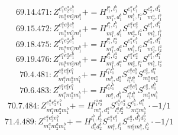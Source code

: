 \documentclass[letterpaper,10pt,fleqn,leqno,onecolumn]{article}
\begin{document}
\begin{equation} \;\;\;\;\;\;  69.14.471: Z^{e_{1}^{a}e_{2}^{a}e_{1}^{b}}_{m_{1}^{a}m_{2}^{a}m_{1}^{b}}+=H^{l_{1}^{a},l_{1}^{b}}_{m_{1}^{a},d_{1}^{b}}S^{e_{1}^{a}e_{1}^{b}}_{m_{1}^{b},l_{1}^{a}}S^{e_{2}^{a},d_{1}^{b}}_{m_{2}^{a},l_{1}^{b}} \end{equation}
\begin{equation} \;\;\;\;\;\;  69.15.472: Z^{e_{1}^{a}e_{2}^{a}e_{1}^{b}}_{m_{1}^{a}m_{2}^{a}m_{1}^{b}}+=H^{l_{1}^{a},l_{1}^{b}}_{m_{1}^{a},d_{1}^{b}}S^{e_{1}^{a}e_{2}^{a}}_{m_{2}^{a},l_{1}^{a}}S^{e_{1}^{b},d_{1}^{b}}_{m_{1}^{b},l_{1}^{b}} \end{equation}
\begin{equation} \;\;\;\;\;\;  69.18.475: Z^{e_{1}^{a}e_{2}^{a}e_{1}^{b}}_{m_{1}^{a}m_{2}^{a}m_{1}^{b}}+=H^{l_{1}^{a},l_{2}^{a}}_{m_{1}^{a},d_{1}^{a}}S^{e_{1}^{a}e_{1}^{b}}_{m_{1}^{b},l_{1}^{a}}S^{e_{2}^{a},d_{1}^{a}}_{m_{2}^{a},l_{2}^{a}} \end{equation}
\begin{equation} \;\;\;\;\;\;  69.19.476: Z^{e_{1}^{a}e_{2}^{a}e_{1}^{b}}_{m_{1}^{a}m_{2}^{a}m_{1}^{b}}+=H^{l_{1}^{a},l_{2}^{a}}_{m_{1}^{a},d_{1}^{a}}S^{e_{1}^{a}e_{2}^{a}}_{m_{2}^{a},l_{1}^{a}}S^{e_{1}^{b},d_{1}^{a}}_{m_{1}^{b},l_{2}^{a}} \end{equation}
\begin{equation} \;\;\;\;\;\;  70.4.481: Z^{e_{1}^{a}e_{2}^{a}e_{1}^{b}}_{m_{1}^{a}m_{2}^{a}m_{1}^{b}}+=H^{l_{1}^{a}l_{1}^{b}}_{m_{1}^{b},d_{1}^{a}}S^{e_{1}^{a}e_{1}^{b}}_{l_{1}^{a}l_{1}^{b}}S^{e_{2}^{a},d_{1}^{a}}_{m_{1}^{a}m_{2}^{a}} \end{equation}
\begin{equation} \;\;\;\;\;\;  70.6.483: Z^{e_{1}^{a}e_{2}^{a}e_{1}^{b}}_{m_{1}^{a}m_{2}^{a}m_{1}^{b}}+=H^{l_{1}^{a}l_{1}^{b}}_{m_{1}^{a},d_{1}^{b}}S^{e_{1}^{a}e_{1}^{b}}_{l_{1}^{a}l_{1}^{b}}S^{e_{2}^{a},d_{1}^{b}}_{m_{2}^{a}m_{1}^{b}} \end{equation}
\begin{equation} \;\;\;\;\;\;  70.7.484: Z^{e_{1}^{a}e_{2}^{a}e_{1}^{b}}_{m_{1}^{a}m_{2}^{a}m_{1}^{b}}+=H^{l_{1}^{a}l_{2}^{a}}_{m_{1}^{a},d_{1}^{a}}S^{e_{1}^{a}e_{2}^{a}}_{l_{1}^{a}l_{2}^{a}}S^{e_{1}^{b},d_{1}^{a}}_{m_{2}^{a}m_{1}^{b}}\cdot -1/1 \end{equation}
\begin{equation} \;\;\;\;\;\;  71.4.489: Z^{e_{1}^{a}e_{2}^{a}e_{1}^{b}}_{m_{1}^{a}m_{2}^{a}m_{1}^{b}}+=H^{l_{1}^{b},l_{2}^{b}}_{d_{1}^{b}d_{2}^{b}}S^{e_{1}^{a}e_{1}^{b}}_{m_{1}^{a},l_{1}^{b}}S^{e_{2}^{a},d_{1}^{b}d_{2}^{b}}_{m_{2}^{a}m_{1}^{b},l_{2}^{b}}\cdot -1/1 \end{equation}
\end{document}
